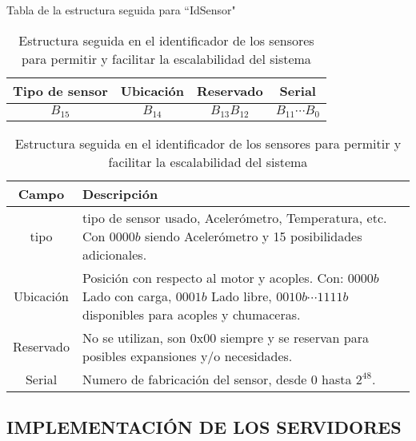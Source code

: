     \begin{table}[ht]
        \begin{center}
            Tabla de la estructura seguida para ``IdSensor"\  \\

            \vspace{0.3cm}
            \begin{tabular}{|c|c|c|c|}
                \hline
                Tipo de sensor & Ubicación & Reservado  & Serial \\\hline
                $ B_{15} $ & $ B_{14} $  & $ B_{13}B_{12} $ & $ B_{11}\cdots B_{0} $\\
                \hline
            \end{tabular}

            \vspace{0.3cm}
            \begin{tabular}{|c|p{13cm}|}
                \hline
                Campo       & Descripción
                \\\hline\hline
                tipo        & tipo de sensor usado, Acelerómetro, Temperatura, etc.
                Con $0000b$ siendo Acelerómetro y 15 posibilidades adicionales.
                \\\hline
                Ubicación   & Posición con respecto al motor y acoples. Con:
                $0000b$ Lado con carga, $ 0001b$ Lado libre, $ 0010b\cdots1111b $
                disponibles para acoples y chumaceras.
                \\\hline
                Reservado   & No se utilizan, son 0x00 siempre y se reservan para
                posibles expansiones y/o necesidades.
                \\\hline
                Serial      & Numero de fabricación del sensor, desde 0 hasta $2^48$.
                \\\hline
            \end{tabular}
        \end{center}
        \caption[Estructura IdSensor]{Estructura seguida en el identificador de
        los sensores para permitir y facilitar la escalabilidad del sistema}
        \label{tab:CodIdSensor}
    \end{table}


 \newpage
\subsection{IMPLEMENTACIÓN DE LOS SERVIDORES}

